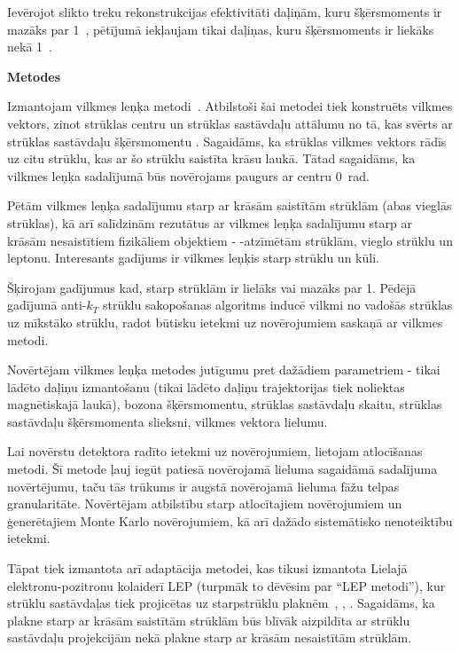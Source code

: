 Ievērojot slikto treku rekonstrukcijas efektivitāti daļiņām, kuru šķērsmoments ir mazāks par 1~\GeV, pētījumā iekļaujam tikai daļiņas, kuru šķērsmoments ir liekāks nekā 1~\GeV.
 
\medskip
\textbf{Metodes}
\nopagebreak\medskip

Izmantojam vilkmes leņķa metodi~\cite{Gallicchio:2010sw}. Atbilstoši šai metodei tiek konstruēts vilkmes vektors, zinot strūklas centru un strūklas sastāvdaļu attālumu no tā, kas svērts ar strūklas sastāvdaļu šķērsmomentu \pt. Sagaidāms, ka strūklas vilkmes vektors rādīs uz citu strūklu, kas ar šo strūklu saistīta krāsu laukā. Tātad sagaidāms, ka vilkmes leņķa sadalījumā būs novērojams paugurs ar centru 0~rad.

Pētām vilkmes leņķa sadalījumu starp ar krāsām saistītām strūklām (abas vieglās strūklas), kā arī salīdzinām rezutātus ar vilkmes leņķa sadalījumu starp ar krāsām nesaistītiem fizikāliem objektiem - \cPqb-atzīmētām strūklām, vieglo strūklu un leptonu. Interesants gadījums ir vilkmes leņķis starp strūklu un kūli.

Šķirojam gadījumus kad, \DeltaR starp strūklām ir lielāks vai mazāks par 1. Pēdējā gadījumā anti-$k_{T}$ strūklu sakopošanas algoritms inducē vilkmi no vadošās strūklas uz mīkstāko strūklu, radot būtisku ietekmi uz novērojumiem saskaņā ar vilkmes metodi.

Novērtējam vilkmes leņķa metodes jutīgumu pret dažādiem parametriem - tikai lādēto daļiņu izmantošanu (tikai lādēto daļiņu trajektorijas tiek noliektas magnētiskajā laukā), \PW bozona šķērsmomentu, strūklas sastāvdaļu skaitu, strūklas sastāvdaļu šķērsmomenta slieksni, vilkmes vektora lielumu.

Lai novērstu detektora radīto ietekmi uz novērojumiem, lietojam atlocīšanas metodi. Šī metode ļauj iegūt patiesā novērojamā lieluma sagaidāmā sadalījuma novērtējumu, taču tās trūkums ir augstā novērojamā lieluma fāžu telpas granularitāte. Novērtējam atbilstību starp atlocītajiem novērojumiem un ģenerētajiem Monte Karlo novērojumiem, kā arī dažādo sistemātisko nenoteiktību ietekmi.  

Tāpat tiek izmantota arī adaptācija metodei, kas tikusi izmantota Lielajā elektronu-pozitronu kolaiderī LEP (turpmāk to dēvēsim par ``LEP metodi''), kur strūklu sastāvdaļas tiek projicētas uz starpstrūklu plaknēm~\cite{Abbiendi:2005es}, \cite{Abdallah:2006uq}, \cite{Achard:2003pe}. Sagaidāms, ka plakne starp ar krāsām saistītām strūklām būs blīvāk aizpildīta ar strūklu sastāvdaļu projekcijām nekā plakne starp ar krāsām nesaistītām strūklām.  

